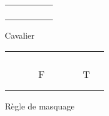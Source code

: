 \documentclass[a4paper,11pt]{article}
\begin{document}
\begin{figure}[h]
\begin{minipage}{.3\linewidth}
\begin{tabular}{|p{0.1cm}|p{0.1cm}|p{0.1cm}|p{0.1cm}|p{0.1cm}|}
                    \hline
                     &\cellcolor{green!25}& &\cellcolor{green!25}& \\
                    \hline
                    \cellcolor{green!25}& & & &\cellcolor{green!25}\\
                    \hline
                     & &\cellcolor{black!20}& & \\
                    \hline
                    \cellcolor{green!25}& & & &\cellcolor{green!25}\\
                    \hline
                     &\cellcolor{green!25}& &\cellcolor{green!25}& \\
                    \hline
                \end{tabular}
                \caption{Cavalier}
                \label{fig:Cavalier}
              \end{minipage}
          \end{figure}
      
        \begin{figure}[!htb]
        	\centering
        	\begin{tabular}{|p{0.1cm}|p{0.1cm}|p{0.1cm}|p{0.1cm}|p{0.1cm}|p{0.1cm}|p{0.1cm}|p{0.1cm}|}
        		\hline
                 & & & & & &\cellcolor{green!25}& \\
                \hline
                 & & & & & &\cellcolor{green!25}& \\
                \hline
                 & & & & & &\cellcolor{green!25}& \\
                \hline
                 &\cellcolor{green!25}& &\cellcolor{green!25}& & &\cellcolor{green!25}& \\
                \hline
                \cellcolor{green!25}& & & &\cellcolor{green!25}& &\cellcolor{green!25}& \\
                \hline
                \cellcolor{red!25}~&\cellcolor{red!25}~&\cellcolor{black!25}F &\cellcolor{green!25}&\cellcolor{green!25}&\cellcolor{green!25}&\cellcolor{black!25}T&\cellcolor{green!25}\\
                \hline
                \cellcolor{green!25}& & & &\cellcolor{green!25}& &\cellcolor{green!25}& \\
                \hline
                 &\cellcolor{green!25}& &\cellcolor{green!25}& & &\cellcolor{green!25}& \\
                \hline
        	\end{tabular}
            \caption{Règle de masquage}
            \label{fig:masquage}
        \end{figure}
        
\end{document}
